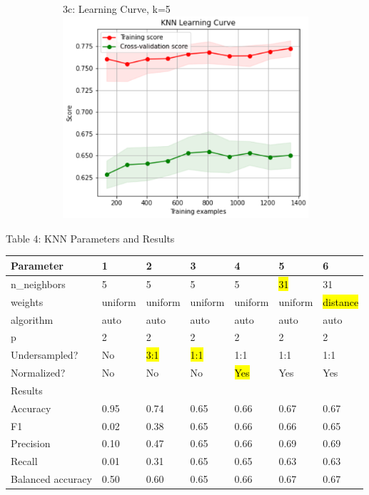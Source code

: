 \documentclass{article}
\begin{document}
\begin{figure}
\begin{subfigure}{.34\textwidth}
	\end{subfigure}
	\begin{subfigure}{.35\textwidth}
	\centering
		3c: Learning Curve, k=5
	\includegraphics[width=\linewidth]{poland_knn_learning_curve_k_5.png}
	
\end{subfigure}

	\label{fig:test}
\end{figure}


\begin{table}
	
	\centering
	Table 4: KNN Parameters and Results\\
	\begin{tabular}{ l l l l l l l }
		\hline
		Parameter & 1 & 2 & 3 & 4 & 5 & 6\\
		\hline
		n\_neighbors & 5 & 5 & 5 & 5 & \hl{31} & 31 \\
		weights & uniform & uniform & uniform & uniform & uniform & \hl{distance} \\
		algorithm & auto & auto & auto & auto & auto & auto \\
		p & 2 & 2 & 2 & 2 & 2 & 2\\
		Undersampled? & No & \hl{3:1} & \hl{1:1} & 1:1 & 1:1 & 1:1 \\
		Normalized? & No & No & No & \hl{Yes} & Yes & Yes\\
		\hline
		Results & & & & & \\
		\hline
		Accuracy & 0.95 & 0.74 & 0.65 & 0.66 & 0.67 & 0.67\\
		F1 & 0.02 & 0.38 & 0.65 &  0.66 & 0.66 & 0.65\\
		Precision & 0.10 & 0.47 & 0.65 & 0.66 & 0.69 & 0.69\\
		Recall & 0.01 & 0.31 & 0.65 &  0.65 & 0.63 & 0.63\\
		Balanced accuracy & 0.50 & 0.60 & 0.65 & 0.66 & 0.67 & 0.67\\
		
		\hline 
	\end{tabular}
\end{table}
\end{document}
